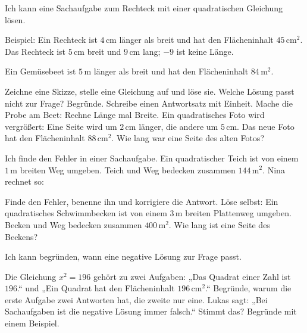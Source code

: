\begin{aufgabe}{Ich kann eine Sachaufgabe zum Rechteck mit einer quadratischen Gleichung lösen.}
\begin{minipage}[t]{0.64\linewidth}\vspace{0pt}
Beispiel: Ein Rechteck ist $4\,\text{cm}$ länger als breit und hat den Flächeninhalt $45\,\text{cm}^2$.
Das Rechteck ist $5\,\text{cm}$ breit und $9\,\text{cm}$ lang; $-9$ ist keine Länge.
\end{minipage}\hfill
\begin{minipage}[t]{0.32\linewidth}\vspace{0pt}
\end{minipage}
\medskip
Ein Gemüsebeet ist $5\,\text{m}$ länger als breit und hat den Flächeninhalt $84\,\text{m}^2$.
\begin{teile}
\teil Zeichne eine Skizze, stelle eine Gleichung auf und löse sie.
\teil Welche Lösung passt nicht zur Frage? Begründe.
\teil Schreibe einen Antwortsatz mit Einheit.
\teil Mache die Probe am Beet: Rechne Länge mal Breite.
\teil Ein quadratisches Foto wird vergrößert: Eine Seite wird um $2\,\text{cm}$ länger, die andere um $5\,\text{cm}$. Das neue Foto hat den Flächeninhalt $88\,\text{cm}^2$. Wie lang war eine Seite des alten Fotos?
\end{teile}
\end{aufgabe}

\begin{aufgabe}{Ich finde den Fehler in einer Sachaufgabe. Ein quadratischer Teich ist von einem $1\,\text{m}$ breiten Weg umgeben. Teich und Weg bedecken zusammen $144\,\text{m}^2$. Nina rechnet so:}
\begin{teile}
\teil Finde den Fehler, benenne ihn und korrigiere die Antwort.
\teil Löse selbst: Ein quadratisches Schwimmbecken ist von einem $3\,\text{m}$ breiten Plattenweg umgeben. Becken und Weg bedecken zusammen $400\,\text{m}^2$. Wie lang ist eine Seite des Beckens?
\end{teile}
\end{aufgabe}

\begin{aufgabe}{Ich kann begründen, wann eine negative Lösung zur Frage passt.}
\begin{teile}
\teil Die Gleichung $x^2 = 196$ gehört zu zwei Aufgaben: „Das Quadrat einer Zahl ist $196$.“ und „Ein Quadrat hat den Flächeninhalt $196\,\text{cm}^2$.“ Begründe, warum die erste Aufgabe zwei Antworten hat, die zweite nur eine.
\teil Lukas sagt: „Bei Sachaufgaben ist die negative Lösung immer falsch.“ Stimmt das? Begründe mit einem Beispiel.
\end{teile}
\end{aufgabe}
